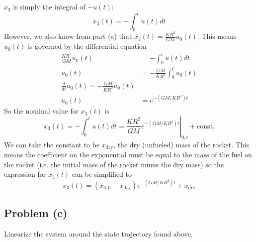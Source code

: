 \documentclass[11pt]{article}
\begin{document}
\subparagraph*{}
$x_3$ is simply the integral of $-u(t)$:
\begin{equation*}
	x_3(t) = -\int_{0}^{t}u(t)dt
\end{equation*}
However, we also know from part (a) that $x_3(t) =  \frac{KR^2}{GM}u_0(t)$. This means $u_0(t)$ is governed by the differential equation
\begin{align*}
	\frac{KR^2}{GM}u_0(t) &= -\int_0^t u(t)dt\\
	u_0(t) &= -\frac{GM}{KR^2}\int_0^tu_0(t) \\
	\frac{d}{dt}u_0(t) = -\frac{GM}{KR^2}u_0(t) \\
	u_0(t) &= e^{-(GM/KR^2)t}
\end{align*}
So the nominal value for $x_3(t)$ is
\begin{equation*}
	x_3(t) = -\int_{0}^{t}u(t)dt = \left. \frac{KR^2}{GM} e^{-(GM/KR^2)t} \right |_{0,t} + \text{const.}
\end{equation*}
We can take the constant to be $x_\text{dry}$, the dry (unfueled) mass of the rocket. This means the coefficient on the exponential must be equal to the mass of the fuel on the rocket (i.e. the initial mass of the rocket minus the dry mass) so the expression for $x_3(t)$ can be simplified to
\begin{equation*}
	x_3(t) = (x_{3,0} - x_\text{dry})e^{-(GM/KR^2)t} + x_\text{dry}
\end{equation*}

\subsection*{Problem (c)}
Linearize the system around the state trajectory found above.
\end{document}
